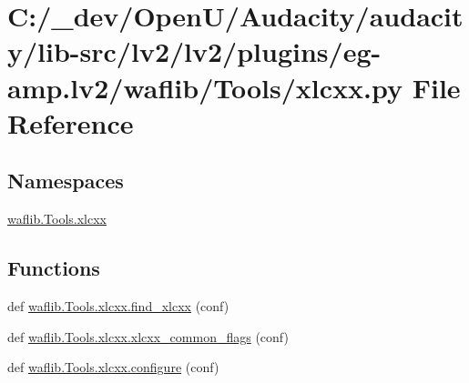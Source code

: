 \hypertarget{lv2_2plugins_2eg-amp_8lv2_2waflib_2_tools_2xlcxx_8py}{}\section{C\+:/\+\_\+dev/\+Open\+U/\+Audacity/audacity/lib-\/src/lv2/lv2/plugins/eg-\/amp.lv2/waflib/\+Tools/xlcxx.py File Reference}
\label{lv2_2plugins_2eg-amp_8lv2_2waflib_2_tools_2xlcxx_8py}
\subsection*{Namespaces}
\begin{DoxyCompactItemize}
\item 
 \hyperlink{namespacewaflib_1_1_tools_1_1xlcxx}{waflib.\+Tools.\+xlcxx}
\end{DoxyCompactItemize}
\subsection*{Functions}
\begin{DoxyCompactItemize}
\item 
def \hyperlink{namespacewaflib_1_1_tools_1_1xlcxx_a8620e3d06d6be208c56bd82ebc223078}{waflib.\+Tools.\+xlcxx.\+find\+\_\+xlcxx} (conf)
\item 
def \hyperlink{namespacewaflib_1_1_tools_1_1xlcxx_a595cde6fb1bcdb1dea9bbabf310a807b}{waflib.\+Tools.\+xlcxx.\+xlcxx\+\_\+common\+\_\+flags} (conf)
\item 
def \hyperlink{namespacewaflib_1_1_tools_1_1xlcxx_a711febe8407f7d68502ceddf57b6a749}{waflib.\+Tools.\+xlcxx.\+configure} (conf)
\end{DoxyCompactItemize}
